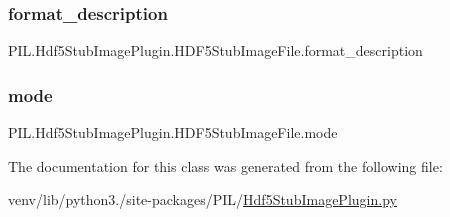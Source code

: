 \subsubsection{\texorpdfstring{format\+\_\+description}{format\_description}}
{\footnotesize\ttfamily P\+I\+L.\+Hdf5\+Stub\+Image\+Plugin.\+H\+D\+F5\+Stub\+Image\+File.\+format\+\_\+description\hspace{0.3cm}{\ttfamily [static]}}

\mbox{\label{classPIL_1_1Hdf5StubImagePlugin_1_1HDF5StubImageFile_ab310b8a93b8c0b86272cb435e1bada2f}} 
\subsubsection{\texorpdfstring{mode}{mode}}
{\footnotesize\ttfamily P\+I\+L.\+Hdf5\+Stub\+Image\+Plugin.\+H\+D\+F5\+Stub\+Image\+File.\+mode}



The documentation for this class was generated from the following file\+:\begin{DoxyCompactItemize}
\item 
venv/lib/python3./site-\/packages/\+P\+I\+L/\hyperlink{Hdf5StubImagePlugin_8py}{Hdf5\+Stub\+Image\+Plugin.\+py}\end{DoxyCompactItemize}
